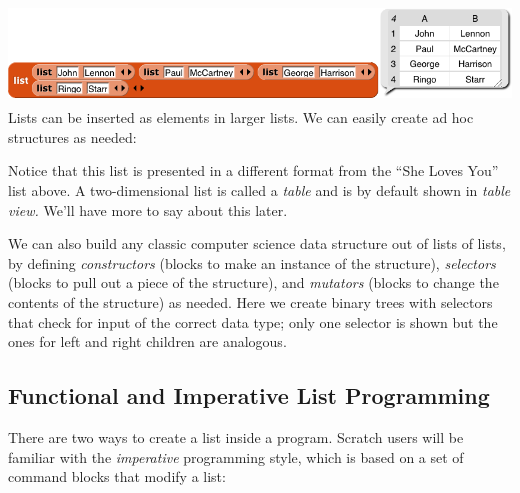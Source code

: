 \includegraphics[width=5.88889in,height=1.04861in]{media/image538.png}Lists
can be inserted as elements in larger lists. We can easily create ad hoc
structures as needed:

Notice that this list is presented in a different format from the ``She
Loves You'' list above. A two-dimensional list is called a \emph{table}
and is by default shown in \emph{table view.} We'll have more to say
about this later.

We can also build any classic computer science data structure out of
lists of lists, by defining \emph{constructors} (blocks to make an
instance of the structure), \emph{selectors} (blocks to pull out a piece
of the structure), and \emph{mutators} (blocks to change the contents of
the structure) as needed. Here we create binary trees with selectors
that check for input of the correct data type; only one selector is
shown but the ones for left and right children are analogous.

\subsection{\texorpdfstring{\hfill\break
Functional and Imperative List
Programming}{ Functional and Imperative List Programming}}\label{functional-and-imperative-list-programming}

There are two ways to create a list inside a program. Scratch users will
be familiar with the \emph{imperative} programming style, which is based
on a set of command blocks that modify a list:

